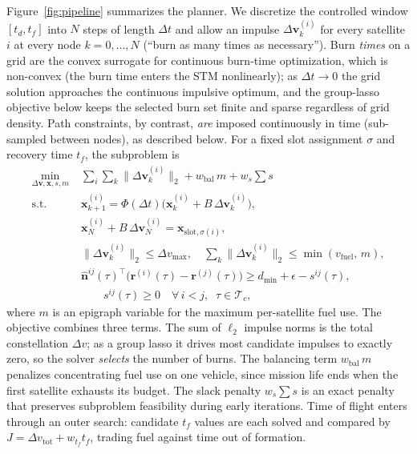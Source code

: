 \documentclass[10pt,twocolumn,letterpaper]{article}
\begin{document}
Figure~\ref{fig:pipeline} summarizes the planner. We discretize the controlled
window $[t_d, t_f]$ into $N$ steps of length $\Delta t$ and allow an impulse
$\Delta\mathbf{v}^{(i)}_k$ for every satellite $i$ at every node $k = 0,\dots,N$
(``burn as many times as necessary''). Burn \emph{times} on a grid are the
convex surrogate for continuous burn-time optimization, which is non-convex
(the burn time enters the STM nonlinearly); as $\Delta t \to 0$ the grid
solution approaches the continuous impulsive optimum, and the group-lasso
objective below keeps the selected burn set finite and sparse regardless of
grid density. Path constraints, by contrast, \emph{are} imposed continuously
in time (sub-sampled between nodes), as described below. For a fixed slot
assignment $\sigma$ and recovery time $t_f$, the subproblem is
\begin{align}
\label{eq:scp}
\min_{\Delta\mathbf{v}, \mathbf{x}, s, m} \;
& \sum_{i}\sum_{k} \bigl\|\Delta\mathbf{v}^{(i)}_k\bigr\|_2
  + w_{\mathrm{bal}}\, m
  + w_{s} \textstyle\sum s \\
\text{s.t.}\;\;
& \mathbf{x}^{(i)}_{k+1} = \Phi(\Delta t)\bigl(\mathbf{x}^{(i)}_k + B\,\Delta\mathbf{v}^{(i)}_k\bigr), \nonumber\\
& \mathbf{x}^{(i)}_N + B\,\Delta\mathbf{v}^{(i)}_N = \mathbf{x}_{\mathrm{slot},\sigma(i)}, \nonumber\\
& \bigl\|\Delta\mathbf{v}^{(i)}_k\bigr\|_2 \le \Delta v_{\max}, \quad
  \textstyle\sum_k \bigl\|\Delta\mathbf{v}^{(i)}_k\bigr\|_2 \le \min(v_{\mathrm{fuel}},\, m), \nonumber\\
& \hat{\mathbf{n}}^{ij}(\tau)^{\top}\bigl(\mathbf{r}^{(i)}(\tau) - \mathbf{r}^{(j)}(\tau)\bigr) \ge d_{\min} + \epsilon - s^{ij}(\tau), \nonumber\\
& \qquad s^{ij}(\tau) \ge 0 \quad \forall\, i<j,\;\; \tau \in \mathcal{T}_c, \nonumber
\end{align}
where $m$ is an epigraph variable for the maximum per-satellite fuel use. The
objective combines three terms. The sum of $\ell_2$ impulse norms is the total
constellation $\Delta v$; as a group lasso it drives most candidate impulses to
exactly zero, so the solver \emph{selects} the number of burns. The balancing
term $w_{\mathrm{bal}}\,m$ penalizes concentrating fuel use on one vehicle,
since mission life ends when the first satellite exhausts its budget. The
slack penalty $w_s \sum s$ is an exact penalty that preserves subproblem
feasibility during early iterations. Time of flight enters through an outer
search: candidate $t_f$ values are each solved and compared by
$J = \Delta v_{\mathrm{tot}} + w_{t_f} t_f$, trading fuel against time out of
formation.
\end{document}
